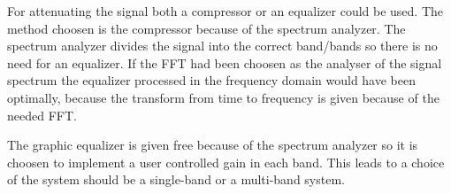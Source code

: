 For attenuating the signal both a compressor or an equalizer could be used. The method choosen is the compressor because of the spectrum analyzer. The spectrum analyzer divides the signal into the correct band/bands so there is no need for an equalizer. If the FFT had been choosen as the analyser of the signal spectrum the equalizer processed in the frequency domain would have been optimally, because the transform from time to frequency is given because of the needed FFT. 

The graphic equalizer is given free because of the spectrum analyzer so it is choosen to implement a user controlled gain in each band. This leads to a choice of the system should be a single-band or a multi-band system.   





